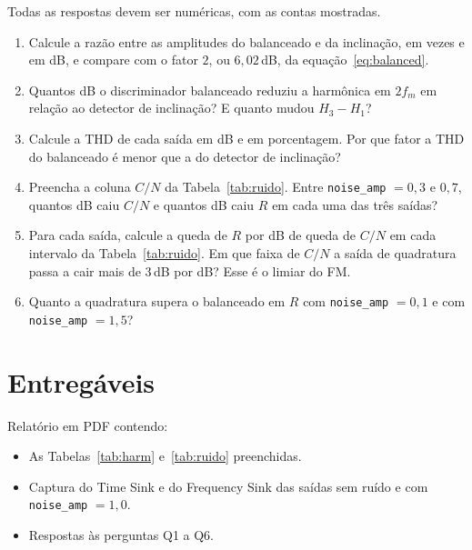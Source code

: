 \documentclass[11pt,a4paper]{article}
\begin{document}
Todas as respostas devem ser numéricas, com as contas mostradas.

\begin{enumerate}[label=\textbf{Q\arabic*.}, leftmargin=*]

  \item Calcule a razão entre as amplitudes do balanceado e da inclinação, em
    vezes e em dB, e compare com o fator $2$, ou $6{,}02$\,dB, da
    equação~\eqref{eq:balanced}.

  \item Quantos dB o discriminador balanceado reduziu a harmônica em $2f_m$ em
    relação ao detector de inclinação? E quanto mudou $H_3 - H_1$?

  \item Calcule a THD de cada saída em dB e em porcentagem. Por que fator a THD
    do balanceado é menor que a do detector de inclinação?

  \item Preencha a coluna $C/N$ da Tabela~\ref{tab:ruido}. Entre
    \texttt{noise\_amp} $= 0{,}3$ e $0{,}7$, quantos dB caiu $C/N$ e quantos dB
    caiu $R$ em cada uma das três saídas?

  \item Para cada saída, calcule a queda de $R$ por dB de queda de $C/N$ em
    cada intervalo da Tabela~\ref{tab:ruido}. Em que faixa de $C/N$ a saída de
    quadratura passa a cair mais de $3$\,dB por dB? Esse é o limiar do FM.

  \item Quanto a quadratura supera o balanceado em $R$ com
    \texttt{noise\_amp} $= 0{,}1$ e com \texttt{noise\_amp} $= 1{,}5$?

\end{enumerate}

\section*{Entregáveis}

Relatório em PDF contendo:
\begin{itemize}
  \item As Tabelas~\ref{tab:harm} e~\ref{tab:ruido} preenchidas.
  \item Captura do Time Sink e do Frequency Sink das saídas sem ruído e com
    \texttt{noise\_amp} $= 1{,}0$.
  \item Respostas às perguntas Q1 a Q6.
\end{itemize}
\end{document}
